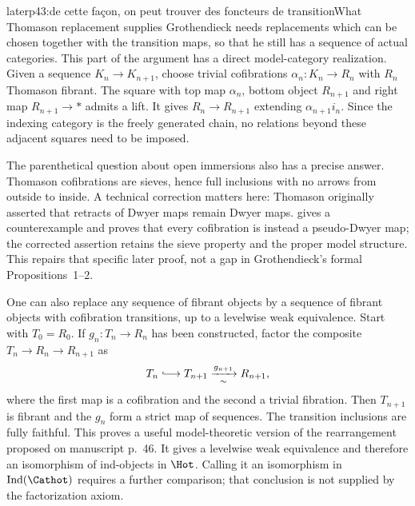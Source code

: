\begin{dcomment}{later}{p43:de cette façon, on peut trouver des foncteurs de transition}{What Thomason replacement supplies}
Grothendieck needs replacements which can be chosen together with the transition maps, so that he still has a sequence of actual categories. This part of the argument has a direct model-category realization. Given a sequence $K_n\to K_{n+1}$, choose trivial cofibrations $\alpha_n:K_n\to R_n$ with $R_n$ Thomason fibrant. The square with top map $\alpha_n$, bottom object $R_{n+1}$ and right map $R_{n+1}\to *$ admits a lift. It gives $R_n\to R_{n+1}$ extending $\alpha_{n+1}i_n$. Since the indexing category is the freely generated chain, no relations beyond these adjacent squares need to be imposed.

The parenthetical question about open immersions also has a precise answer. Thomason cofibrations are sieves, hence full inclusions with no arrows from outside to inside. A technical correction matters here: Thomason originally asserted that retracts of Dwyer maps remain Dwyer maps. \citet{Cisinski1999Dwyer} gives a counterexample and proves that every cofibration is instead a pseudo-Dwyer map; the corrected assertion retains the sieve property and the proper model structure. This repairs that specific later proof, not a gap in Grothendieck's formal Propositions~1--2.

One can also replace any sequence of fibrant objects by a sequence of fibrant objects with cofibration transitions, up to a levelwise weak equivalence. Start with $T_0=R_0$. If $g_n:T_n\to R_n$ has been constructed, factor the composite $T_n\to R_n\to R_{n+1}$ as
\[
 T_n\lhook\joinrel\longrightarrow T_{n+1}
       \xrightarrow[\sim]{g_{n+1}}R_{n+1},
\]
where the first map is a cofibration and the second a trivial fibration. Then $T_{n+1}$ is fibrant and the $g_n$ form a strict map of sequences. The transition inclusions are fully faithful. This proves a useful model-theoretic version of the rearrangement proposed on manuscript p.~46. It gives a levelwise weak equivalence and therefore an isomorphism of ind-objects in $\Hot$. Calling it an isomorphism in $\operatorname{Ind}(\Cathot)$ requires a further comparison; that conclusion is not supplied by the factorization axiom.
\end{dcomment}

